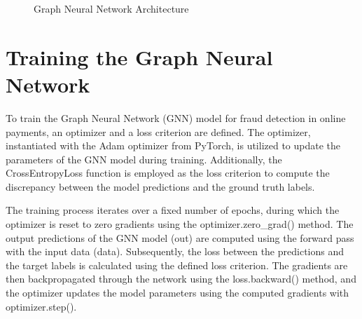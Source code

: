 \begin{figure}[H]
	\centering
	\caption{Graph Neural Network Architecture}
	\label{fig:gnn_architecture}
\end{figure}

\section{Training the Graph Neural Network}
\hspace{\parindent}
To train the Graph Neural Network (GNN) model for fraud detection in online payments, an optimizer and a loss criterion are defined. The optimizer, instantiated with the Adam optimizer from PyTorch, is utilized to update the parameters of the GNN model during training. Additionally, the CrossEntropyLoss function is employed as the loss criterion to compute the discrepancy between the model predictions and the ground truth labels.

The training process iterates over a fixed number of epochs, during which the optimizer is reset to zero gradients using the optimizer.zero\_grad() method. The output predictions of the GNN model (out) are computed using the forward pass with the input data (data). Subsequently, the loss between the predictions and the target labels is calculated using the defined loss criterion. The gradients are then backpropagated through the network using the loss.backward() method, and the optimizer updates the model parameters using the computed gradients with optimizer.step().

